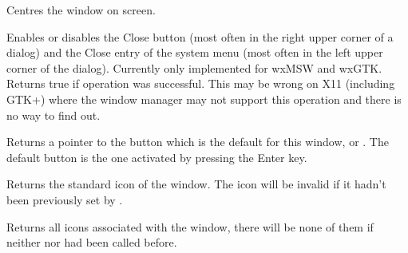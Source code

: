 
Centres the window on screen.






\label{wxtoplevelenableclosebutton}


Enables or disables the Close button (most often in the right
upper corner of a dialog) and the Close entry of the system
menu (most often in the left upper corner of the dialog).
Currently only implemented for wxMSW and wxGTK. Returns
true if operation was successful. This may be wrong on
X11 (including GTK+) where the window manager may not support
this operation and there is no way to find out.

\label{wxtoplevelwindowgetdefaultitem}


Returns a pointer to the button which is the default for this window, or \NULL.
The default button is the one activated by pressing the Enter key.


\label{wxtoplevelwindowgeticon}


Returns the standard icon of the window. The icon will be invalid if it hadn't
been previously set by .




\label{wxtoplevelwindowgeticons}


Returns all icons associated with the window, there will be none of them if
neither  nor
 had been called before.

